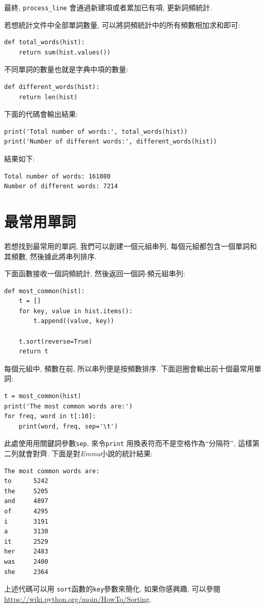 \documentclass[10pt]{book}
\begin{document}
最終, \verb"process_line" 會通過新建項或者累加已有項, 更新詞頻統計.

若想統計文件中全部單詞數量, 可以將詞頻統計中的所有頻數相加求和即可:

\begin{verbatim}
def total_words(hist):
    return sum(hist.values())
\end{verbatim}
%
不同單詞的數量也就是字典中項的數量:

\begin{verbatim}
def different_words(hist):
    return len(hist)
\end{verbatim}
%
下面的代碼會輸出結果:

\begin{verbatim}
print('Total number of words:', total_words(hist))
print('Number of different words:', different_words(hist))
\end{verbatim}
%
結果如下:

\begin{verbatim}
Total number of words: 161080
Number of different words: 7214
\end{verbatim}
%

\section{最常用單詞}

若想找到最常用的單詞, 我們可以創建一個元組串列, 
每個元組都包含一個單詞和其頻數, 然後據此將串列排序.

下面函數接收一個詞頻統計, 然後返回一個詞-頻元組串列:

\begin{verbatim}
def most_common(hist):
    t = []
    for key, value in hist.items():
        t.append((value, key))

    t.sort(reverse=True)
    return t
\end{verbatim}

每個元組中, 頻數在前, 所以串列便是按頻數排序. 
下面迴圈會輸出前十個最常用單詞:

\begin{verbatim}
t = most_common(hist)
print('The most common words are:')
for freq, word in t[:10]:
    print(word, freq, sep='\t')
\end{verbatim}
%
此處使用用關鍵詞參數{\tt sep}, 來令{\tt print} 用換表符而不是空格作為``分隔符'', 
這樣第二列就會對齊.  下面是對{\em Emma}小說的統計結果:

\begin{verbatim}
The most common words are:
to      5242
the     5205
and     4897
of      4295
i       3191
a       3130
it      2529
her     2483
was     2400
she     2364
\end{verbatim}
%
上述代碼可以用 {\tt sort}函數的{\tt key}參數來簡化. 
如果你感興趣, 可以參閱 \url{https://wiki.python.org/moin/HowTo/Sorting}.
\end{document}
